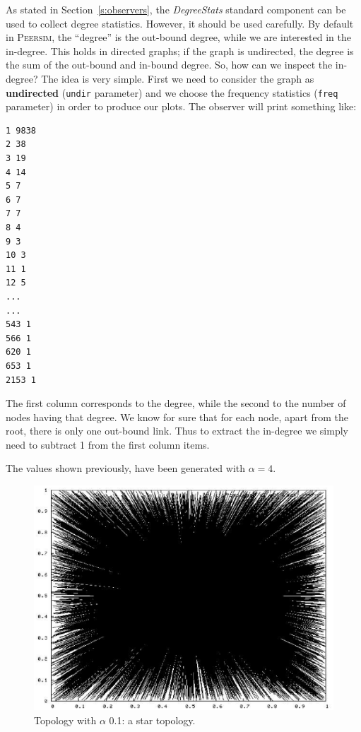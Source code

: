 \documentclass[a4paper,12pt]{article}
\newcommand{\id}[1]{{\scshape\small #1}}
\newcommand{\psim}{\id{Peersim}}
\begin{document}
As stated in Section~\ref{s:observers}, the \emph{DegreeStats} standard
component can be used to collect degree statistics. However, it should 
be used carefully. By default in \psim,
the ``degree'' is the out-bound degree, while we are interested in the
in-degree. This holds in directed graphs; if the graph is undirected,
the degree is the sum of the out-bound and in-bound degree. So, how
can we inspect the in-degree? The idea is very simple. First we need
to consider the graph as \textbf{undirected} (\texttt{undir}
parameter) and we choose the frequency statistics (\texttt{freq}
parameter) in order to produce our plots. The observer will
print something like:

\footnotesize
\begin{verbatim}
1 9838
2 38
3 19
4 14
5 7
6 7
7 7
8 4
9 3
10 3
11 1
12 5
...
...
543 1
566 1
620 1
653 1
2153 1
\end{verbatim}
\normalsize

The first column corresponds to the degree, while the second to the
number of nodes having that degree. We know for sure that for each node, apart from the
root, there is only one out-bound link. Thus to extract the in-degree
we simply need to subtract 1 from the first column items.

The values shown previously, have been generated with $\alpha = 4$. 

\begin{figure}[tb!]
\begin{center}
\includegraphics[scale=0.6]{pic_alfa01.eps}
\end{center}
\caption{Topology with $\alpha$ 0.1: a star topology.\label{t01figure}}
\end{figure}
\end{document}
